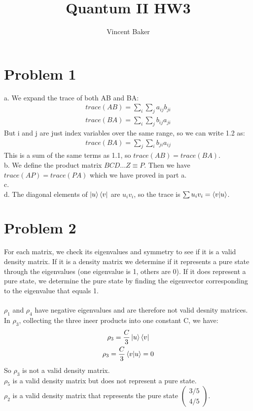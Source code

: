 \documentclass[a4paper,12pt]{article}
\title{Quantum II HW3}
\author{Vincent Baker}
\numberwithin{equation}{section}
\begin{document}
\maketitle

\section{Problem 1}
a. We expand the trace of both AB and BA:
\begin{gather}
 trace(AB)=\sum_i\sum_ja_{ij}b_{ji}\\
 trace(BA)=\sum_i\sum_jb_{ij}a_{ji}
\end{gather}
But i and j are just index variables over the same range, so we can write 1.2 as:
\begin{gather}
 trace(BA)=\sum_j\sum_ib_{ji}a_{ij}
\end{gather}
This is a sum of the same terms as 1.1, so $trace(AB)=trace(BA)$.\\
b. We define the product matrix $BCD...Z\equiv P$. 
Then we have $trace(AP)=trace(PA)$ which we have proved in part a.\\
c. \\
d. The diagonal elements of $\ket{u}\bra{v}$ are $u_iv_i$, so the trace is $\sum u_iv_i=\braket{v|u}$.

\section{Problem 2}
For each matrix, we check its eigenvalues and symmetry to see if it is a valid density matrix. 
If it is a density matrix we determine if it represents a pure state through the eigenvalues (one eigenvalue is 1, others are 0).
If it does represent a pure state, we determine the pure state by finding the eigenvector corresponding to the eigenvalue that equals 1.\\ \\
$\rho_1$ and $\rho_4$ have negative eigenvalues and are therefore not valid desnity matrices.
\\In $\rho_3$, collecting the three ineer products into one constant C, we have:
\begin{gather}
 \rho_3=\frac{C}{3}\ket{u}\bra{v}\\
 \rho_3=\frac{C}{3}\braket{v|u}=0
\end{gather}
So $\rho_3$ is not a valid density matrix.\\
$\rho_5$ is a valid density matrix but does not represent a pure state.\\
$\rho_2$ is a valid density matrix that represents the pure state $\left(\begin{smallmatrix}3/5\\4/5  \end{smallmatrix}\right)$.
\end{document}
